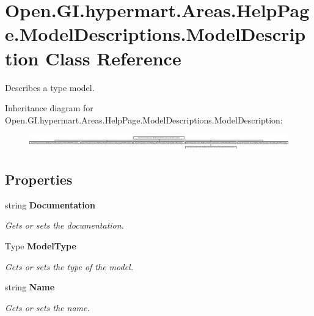 \section{Open.\+G\+I.\+hypermart.\+Areas.\+Help\+Page.\+Model\+Descriptions.\+Model\+Description Class Reference}
\label{class_open_1_1_g_i_1_1hypermart_1_1_areas_1_1_help_page_1_1_model_descriptions_1_1_model_description}


Describes a type model.  


Inheritance diagram for Open.\+G\+I.\+hypermart.\+Areas.\+Help\+Page.\+Model\+Descriptions.\+Model\+Description\+:\begin{figure}[H]
\begin{center}
\leavevmode
\includegraphics[height=0.652427cm]{class_open_1_1_g_i_1_1hypermart_1_1_areas_1_1_help_page_1_1_model_descriptions_1_1_model_description}
\end{center}
\end{figure}
\subsection*{Properties}
\begin{DoxyCompactItemize}
\item 
string \textbf{ Documentation}\hspace{0.3cm}{\ttfamily  [get, set]}
\begin{DoxyCompactList}\small\item\em Gets or sets the documentation. \end{DoxyCompactList}\item 
Type \textbf{ Model\+Type}\hspace{0.3cm}{\ttfamily  [get, set]}
\begin{DoxyCompactList}\small\item\em Gets or sets the type of the model. \end{DoxyCompactList}\item 
string \textbf{ Name}\hspace{0.3cm}{\ttfamily  [get, set]}
\begin{DoxyCompactList}\small\item\em Gets or sets the name. \end{DoxyCompactList}\end{DoxyCompactItemize}


